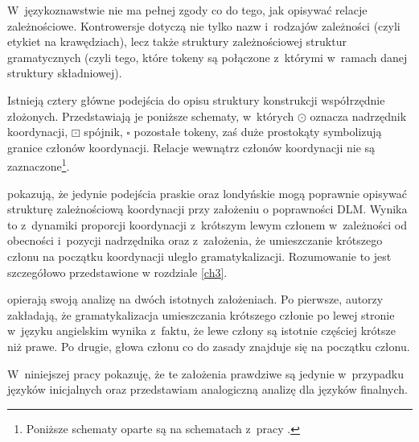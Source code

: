 W~językoznawstwie nie ma pełnej zgody co do tego, jak opisywać relacje zależnościowe. Kontrowersje dotyczą nie tylko nazw i~rodzajów zależności (czyli etykiet na krawędziach), lecz także struktury zależnościowej struktur gramatycznych (czyli tego, które tokeny są połączone z~którymi w~ramach danej struktury składniowej).

Istnieją cztery główne podejścia do opisu struktury konstrukcji współrzędnie złożonych. Przedstawiają je poniższe schematy, w~których $\odot$ oznacza nadrzędnik koordynacji, $\boxdot$ spójnik, $\square$ pozostałe tokeny, zaś duże prostokąty symbolizują granice członów koordynacji. Relacje wewnątrz członów koordynacji nie są zaznaczone\footnote{
Poniższe schematy oparte są na schematach  z~pracy \cite{przepiorkowski2023conjunct}.}.



\cite{przepiorkowski2023conjunct} pokazują, że jedynie podejścia praskie oraz londyńskie mogą poprawnie opisywać strukturę zależnościową koordynacji przy założeniu o poprawności DLM. Wynika to z~dynamiki proporcji koordynacji z~krótszym lewym członem w~zależności od obecności i~pozycji nadrzędnika oraz z~założenia, że umieszczanie krótszego członu na początku koordynacji uległo gramatykalizacji. Rozumowanie to jest szczegółowo przedstawione w rozdziale \ref{ch3}.

\cite{przepiorkowski2023conjunct} opierają swoją analizę na dwóch istotnych założeniach. Po pierwsze, autorzy zakładają, że gramatykalizacja umieszczania krótszego członie po lewej stronie w~języku angielskim wynika z~faktu, że lewe człony są istotnie częściej krótsze niż prawe. Po drugie, głowa członu co do zasady znajduje się na początku członu. 

W~niniejszej pracy pokazuję, że te założenia prawdziwe są jedynie w~przypadku języków inicjalnych oraz przedstawiam analogiczną analizę dla języków finalnych.

